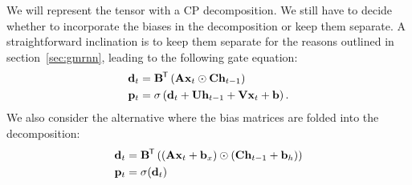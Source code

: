 We will represent the tensor with a CP decomposition. We still have to decide whether to incorporate the
biases in the decomposition or keep them separate. A straightforward inclination is to keep them separate
for the reasons outlined in section~\ref{sec:gmrnn}, leading to the following gate equation:
\begin{align}\label{eq:tggateseparate}
	\mathbf{d}_t &= \mathbf{B}^{\mkern-1.5mu\mathsf{T}}\left(\mathbf{A}\mathbf{x}_t\odot\mathbf{C}\mathbf{h}_{t-1}\right)\\
	\mathbf{p}_t &= \sigma\left(
		\mathbf{d}_t
		+ \mathbf{U}\mathbf{h}_{t-1} + \mathbf{V}\mathbf{x}_t + \mathbf{b}\right).
\end{align}
We also consider the alternative where the bias matrices are folded into the decomposition:
\begin{align}\label{eq:tggatecombined}
	\mathbf{d}_t &= \mathbf{B}^{\mkern-1.5mu\mathsf{T}}\left((\mathbf{A}\mathbf{x}_t 
	+ \mathbf{b}_x)\odot(\mathbf{C}\mathbf{h}_{t-1} + \mathbf{b}_h)\right)\\
	\mathbf{p}_t &= \sigma(\mathbf{d}_t)
\end{align}
